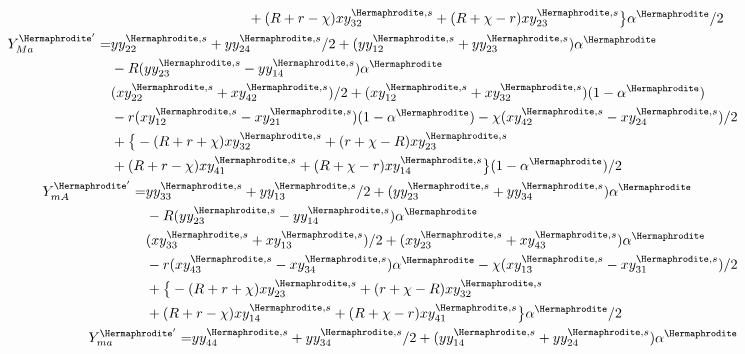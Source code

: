 \documentclass[12pt]{article}
\begin{document}
\begin{subequations}
\begin{align}
\begin{split}
& + (R+r-\chi)xy_{32}^{\Hermaphrodite,s} + (R+\chi-r) xy_{23}^{\Hermaphrodite,s}\big{\}}\alpha^\Hermaphrodite/2
\end{split}
\\
%
\begin{split}
Y_{Ma}^{{\Hermaphrodite}'}=&yy_{22}^{\Hermaphrodite,s}+yy_{24}^{\Hermaphrodite,s}/2+(yy_{12}^{\Hermaphrodite,s}+yy_{23}^{\Hermaphrodite,s})\alpha^\Hermaphrodite\\
&-R(yy_{23}^{\Hermaphrodite,s}-yy_{14}^{\Hermaphrodite,s}) \alpha^\Hermaphrodite\\
&(xy_{22}^{\Hermaphrodite,s}+xy_{42}^{\Hermaphrodite,s})/2+(xy_{12}^{\Hermaphrodite,s}+xy_{32}^{\Hermaphrodite,s})(1-\alpha^\Hermaphrodite)\\
&- r(xy_{12}^{\Hermaphrodite,s}-xy_{21}^{\Hermaphrodite,s})(1-\alpha^\Hermaphrodite) - \chi(xy_{42}^{\Hermaphrodite,s}-xy_{24}^{\Hermaphrodite,s})/2\\
&+\big{\{}-(R+r+\chi)xy_{32}^{\Hermaphrodite,s} +(r+\chi-R) xy_{23}^{\Hermaphrodite,s}\\
&+(R+r-\chi)xy_{41}^{\Hermaphrodite,s}+(R+\chi-r)xy_{14}^{\Hermaphrodite,s}\big{\}}(1-\alpha^\Hermaphrodite)/2
\end{split}
\\
%
\begin{split}
Y_{mA}^{{\Hermaphrodite}'}=&yy_{33}^{\Hermaphrodite,s}+yy_{13}^{\Hermaphrodite,s}/2+(yy_{23}^{\Hermaphrodite,s}+yy_{34}^{\Hermaphrodite,s})\alpha^\Hermaphrodite\\
&-R(yy_{23}^{\Hermaphrodite,s}-yy_{14}^{\Hermaphrodite,s}) \alpha^\Hermaphrodite\\
&(xy_{33}^{\Hermaphrodite,s}+xy_{13}^{\Hermaphrodite,s})/2+(xy_{23}^{\Hermaphrodite,s}+xy_{43}^{\Hermaphrodite,s})\alpha^\Hermaphrodite\\
&- r(xy_{43}^{\Hermaphrodite,s}-xy_{34}^{\Hermaphrodite,s})\alpha^\Hermaphrodite - \chi(xy_{13}^{\Hermaphrodite,s}-xy_{31}^{\Hermaphrodite,s})/2\\
&+\big{\{}-(R+r+\chi)xy_{23}^{\Hermaphrodite,s} +(r+\chi-R)xy_{32}^{\Hermaphrodite,s}\\
&+(R+r-\chi) xy_{14}^{\Hermaphrodite,s} + (R+\chi-r) xy_{41}^{\Hermaphrodite,s}\big{\}}\alpha^\Hermaphrodite/2
\end{split}
\\
%
\begin{split}
Y_{ma}^{{\Hermaphrodite}'}=&yy_{44}^{\Hermaphrodite,s}+yy_{34}^{\Hermaphrodite,s}/2+(yy_{14}^{\Hermaphrodite,s}+yy_{24}^{\Hermaphrodite,s})\alpha^\Hermaphrodite\\

\end{split}
\end{align}
\end{subequations}
\end{document}
